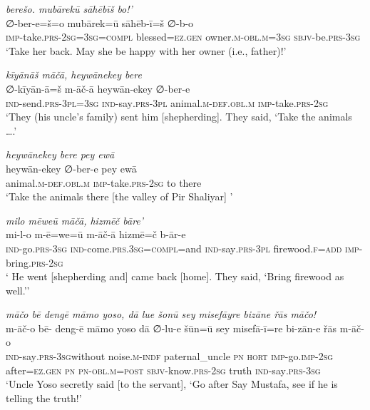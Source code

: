 \ea \label{ZP.106}
\textit{berešo. mubārekū sāhēbīš bo!’} \\ 
\gll ∅-ber-e=š=o mubārek=ū sāhēb-ī=š ∅-b-o \\ 
 \textsc{imp-}take\textsc{.prs}-\textsc{2sg}\textsc{=3sg}\textsc{=compl} blessed\textsc{\textsc{=ez.gen}} owner\textsc{.m}\textsc{-obl}\textsc{.m}\textsc{=3sg} \textsc{sbjv-}be\textsc{.prs}\textsc{-3sg} \\ 
\glt `Take her back. May she be happy with her owner (i.e., father)!'
\z 
 
\ea \label{ŽP.18}
\textit{kīyānāš māčā, heywānekey bere} \\ 
\gll ∅-kīyān-ā=š m-āč-ā heywān-ekey ∅-ber-e \\ 
 \textsc{ind-}send\textsc{.prs}\textsc{-3pl}\textsc{=3sg} \textsc{ind-}say\textsc{.prs}\textsc{-3pl} animal\textsc{.m}\textsc{-def}\textsc{.obl}\textsc{.m} \textsc{imp-}take\textsc{.prs}-\textsc{2sg} \\ 
\glt `They (his uncle’s family) sent him [shepherding]. They said, ‘Take the animals ….'
\z 
 
\ea \label{ŽP.21}
\textit{heywānekey bere pey ewā} \\ 
\gll heywān-ekey ∅-ber-e pey ewā \\ 
 animal\textsc{.m}\textsc{-def}\textsc{.obl}\textsc{.m} \textsc{imp-}take\textsc{.prs}-\textsc{2sg} to there \\ 
\glt `Take the animals there [the valley of Pir Shaliyar] '
\z 
 
\ea \label{ŽP.24}
\textit{milo mēweū māčā, hizmēč bāre’} \\ 
\gll mi-l-o m-ē=we=ū m-āč-ā hizmē=č b-ār-e \\ 
 \textsc{ind-}go\textsc{.prs}\textsc{-3sg} \textsc{ind-}come\textsc{.prs}\textsc{.3sg}\textsc{=compl}=and \textsc{ind-}say\textsc{.prs}\textsc{-3pl} firewood\textsc{.f}\textsc{=add} \textsc{imp-}bring\textsc{.prs}-\textsc{2sg} \\ 
\glt ` He went [shepherding and] came back [home]. They said, ‘Bring firewood as well.’'
\z 
 
\ea \label{ŽP.43}
\textit{māčo bē dengē māmo yoso, dā lue šonū sey misefāyre bizāne řās māčo!} \\ 
\gll m-āč-o bē- deng-ē māmo yoso dā ∅-lu-e šūn=ū sey misefā-ī=re bi-zān-e řās m-āč-o \\ 
 \textsc{ind-}say\textsc{.prs}\textsc{-3sg}without noise\textsc{.m}\textsc{-indf} paternal\_uncle \textsc{pn} \textsc{hort} \textsc{imp-}go.\textsc{imp-}\textsc{2sg} after\textsc{\textsc{=ez.gen}} \textsc{pn} \textsc{pn}\textsc{-obl}\textsc{.m}\textsc{=\textsc{post}} \textsc{sbjv-}know\textsc{.prs}-\textsc{2sg} truth \textsc{ind-}say\textsc{.prs}\textsc{-3sg} \\ 
\glt `Uncle Yoso secretly said [to the servant], ‘Go after Say Mustafa, see if he is telling the truth!'
\z 
 
